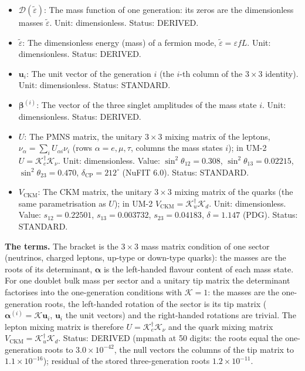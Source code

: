 \documentclass[
  10pt,
]{article}
\begin{document}
\begin{itemize}
  mass state \(i\) (the left-handed flavour content). Unit:
  dimensionless. Status: DERIVED.
\item
  \(\mathcal{D}(\tilde\varepsilon)\): The mass function of one
  generation: its zeros are the dimensionless masses
  \(\tilde\varepsilon\). Unit: dimensionless. Status: DERIVED.
\item
  \(\tilde\varepsilon\): The dimensionless energy (mass) of a fermion
  mode, \(\tilde\varepsilon = \varepsilon fL\). Unit: dimensionless.
  Status: DERIVED.
\item
  \(\mathbf{u}_i\): The unit vector of the generation \(i\) (the
  \(i\)-th column of the \(3 \times 3\) identity). Unit: dimensionless.
  Status: STANDARD.
\item
  \(\boldsymbol{\beta}^{(i)}\): The vector of the three singlet
  amplitudes of the mass state \(i\). Unit: dimensionless. Status:
  DERIVED.
\item
  \(U\): The PMNS matrix, the unitary \(3 \times 3\) mixing matrix of
  the leptons, \(\nu_\alpha = \sum_iU_{\alpha i}\nu_i\) (rows
  \(\alpha = e, \mu, \tau\), columns the mass states \(i\)); in UM-2
  \(U = \mathcal{K}_e^\dagger\mathcal{K}_\nu\). Unit: dimensionless.
  Value: \(\sin^2\theta_{12} = 0.308\), \(\sin^2\theta_{13} = 0.02215\),
  \(\sin^2\theta_{23} = 0.470\), \(\delta_{\mathrm{CP}} = 212^\circ\)
  (NuFIT 6.0). Status: STANDARD.
\item
  \(V_{\mathrm{CKM}}\): The CKM matrix, the unitary \(3 \times 3\)
  mixing matrix of the quarks (the same parametrisation as \(U\)); in
  UM-2 \(V_{\mathrm{CKM}} = \mathcal{K}_u^\dagger\mathcal{K}_d\). Unit:
  dimensionless. Value: \(s_{12} = 0.22501\), \(s_{13} = 0.003732\),
  \(s_{23} = 0.04183\), \(\delta = 1.147\) (PDG). Status: STANDARD.
\end{itemize}

\textbf{The terms.} The bracket is the \(3 \times 3\) mass matrix
condition of one sector (neutrinos, charged leptons, up-type or
down-type quarks): the masses are the roots of its determinant,
\(\boldsymbol{\alpha}\) is the left-handed flavour content of each mass
state. For one doublet bulk mass per sector and a unitary tip matrix the
determinant factorises into the one-generation conditions with
\(\mathcal{K} = 1\): the masses are the one-generation roots, the
left-handed rotation of the sector is its tip matrix
(\(\boldsymbol{\alpha}^{(i)} = \mathcal{K}\mathbf{u}_i\),
\(\mathbf{u}_i\) the unit vectors) and the right-handed rotations are
trivial. The lepton mixing matrix is therefore
\(U = \mathcal{K}_e^\dagger\mathcal{K}_\nu\) and the quark mixing matrix
\(V_{\mathrm{CKM}} = \mathcal{K}_u^\dagger\mathcal{K}_d\). Status:
DERIVED (mpmath at 50 digits: the roots equal the one-generation roots
to \(3.0\times10^{-42}\), the null vectors the columns of the tip matrix
to \(1.1\times10^{-16}\)); residual of the stored three-generation roots
\(1.2\times10^{-11}\).
\end{document}
